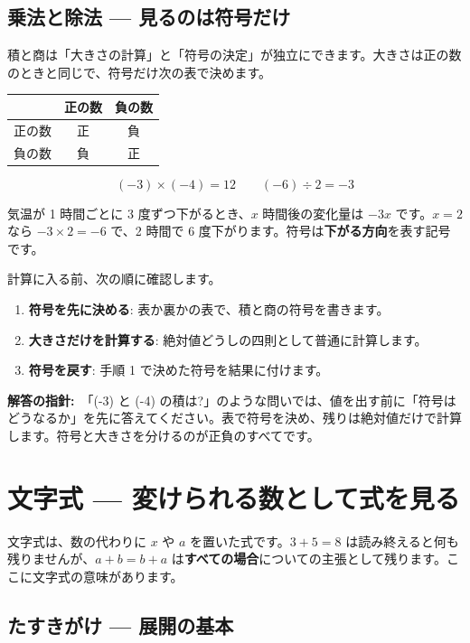 \documentclass{article}
\begin{document}
\subsection{乗法と除法 — 見るのは符号だけ}

積と商は「大きさの計算」と「符号の決定」が独立にできます。大きさは正の数のときと同じで、符号だけ次の表で決めます。

\begin{center}
\begin{tabular}{|c|c|c|}
\hline
 & 正の数 & 負の数 \\
\hline
正の数 & 正 & 負 \\
\hline
負の数 & 負 & 正 \\
\hline
\end{tabular}
\end{center}

\[ (-3) \times (-4) = 12 \qquad (-6) \div 2 = -3 \]

気温が 1 時間ごとに 3 度ずつ下がるとき、\(x\) 時間後の変化量は \(-3x\) です。\(x = 2\) なら \(-3 \times 2 = -6\) で、2 時間で 6 度下がります。符号は\textbf{下がる方向}を表す記号です。

計算に入る前、次の順に確認します。

\begin{enumerate}
\item \textbf{符号を先に決める}: 表か裏かの表で、積と商の符号を書きます。
\item \textbf{大きさだけを計算する}: 絶対値どうしの四則として普通に計算します。
\item \textbf{符号を戻す}: 手順 1 で決めた符号を結果に付けます。
\end{enumerate}

\textbf{解答の指針:}\ 「(-3) と (-4) の積は?」のような問いでは、値を出す前に「符号はどうなるか」を先に答えてください。表で符号を決め、残りは絶対値だけで計算します。符号と大きさを分けるのが正負のすべてです。

\section{文字式 — 変けられる数として式を見る}

文字式は、数の代わりに \(x\) や \(a\) を置いた式です。\(3 + 5 = 8\) は読み終えると何も残りませんが、\(a + b = b + a\) は\textbf{すべての場合}についての主張として残ります。ここに文字式の意味があります。

\subsection{たすきがけ — 展開の基本}
\end{document}
